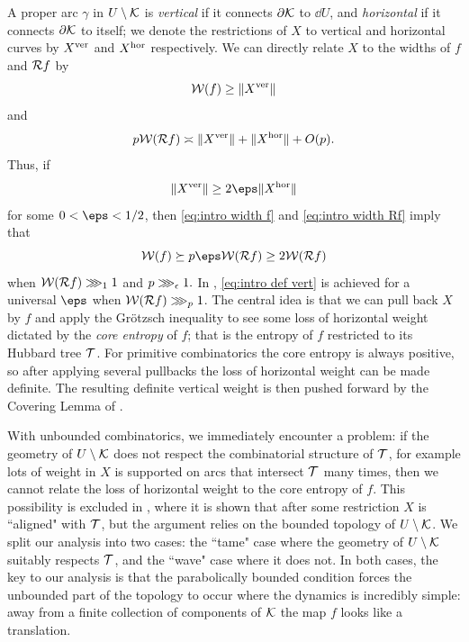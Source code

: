 \documentclass[12pt]{amsart}
\begin{document}
A proper arc $\gamma$ in $U\setminus \mathcal K$ is \textit{vertical}  if it connects $\partial\mathcal K$ to $\dd U$,  and \textit{horizontal} if it connects $\partial \mathcal K$ to
 itself; we denote 
 the restrictions of $X$ to vertical and horizontal curves by $X^{\mathrm{ver}}$ and $X^{\mathrm{hor}}$ respectively. 
 We can directly relate $X$ to the widths of $f$ and $\mathcal R f$ by 
 \begin{equation}\label{eq:intro width f}
 	\mathcal W(f)\geq \|X^{\mathrm{ver}}\|
 \end{equation}
and 
\begin{equation}\label{eq:intro width Rf}
	p\mathcal W(\mathcal R f) \asymp \|X^{\mathrm{ver}}\|+\|X^{\mathrm{hor}}\|+O(p).
\end{equation}
Thus{\color{Green},}  if \begin{equation}\label{eq:intro def vert}
	\|X^\ver\|\geq 2\eps\|X^\hor\|
\end{equation}
for some $0< \eps < 1/2$, then \eqref{eq:intro width f} and \eqref{eq:intro width Rf} imply that 
\begin{equation}\label{eq:intro optimism}
	\WW(f)\succeq p\eps \WW(\RR f)\geq 2\WW(\RR f) 
\end{equation}
when $\mathcal W(\mathcal R f)\ggg_{1} 1$ and $p\ggg_{\epsilon} 1.$
In \cite{K06}, \eqref{eq:intro def vert} is achieved for a universal $\eps$ when $\mathcal W(\mathcal R f)\ggg_{p} 1$. The central idea is that we can pull back $X$ by $f$ and apply the Gr\"otzsch inequality to see some loss of horizontal weight dictated by the \textit{core entropy} of $f$; that is the entropy of $f$ restricted to its Hubbard tree $\mathcal T$. For primitive combinatorics the core entropy is always positive, so after applying several pullbacks the loss of horizontal weight can be made definite. The resulting definite vertical weight is then pushed forward by the Covering Lemma of \cite{KL:QA}.

With unbounded combinatorics, we immediately %
{encounter} a problem: if the geometry of $U\setminus \mathcal K$ does not respect the combinatorial structure of $\mathcal T$, for example lots of weight in $X$ is supported on arcs that intersect $\mathcal T$ many times, then we cannot relate the loss of horizontal weight to the core entropy of $f$. This possibility is excluded in \cite{K06}, where it is shown that after some restriction $X$ is ``aligned" with $\mathcal T$, but the argument relies on the bounded topology of $U\setminus \mathcal K$. 
We split our analysis into two cases: the ``tame" case where the geometry of $U\setminus \mathcal K$ suitably respects $\mathcal T$, and the ``wave" case where it does not. 
In both cases, the key to our analysis is that the parabolically bounded condition forces the unbounded part of the topology to occur where the dynamics is incredibly simple: away from a finite collection of components of $\mathcal K$ the map $f$ looks like a translation.
\end{document}
